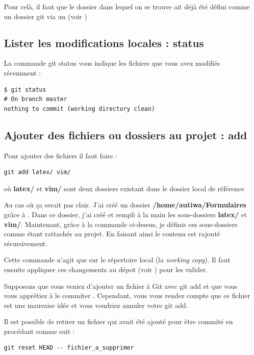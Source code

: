\documentclass[a4paper,twoside]{article}
\begin{document}
Pour celà, il faut que le dossier dans lequel on se trouve ait déjà été défini comme un dossier git via un  (voir )

\subsection{Lister les modifications locales : status}
La commande git status vous indique les fichiers que vous avez modifiés récemment :
\begin{verbatim}
$ git status
# On branch master
nothing to commit (working directory clean)
\end{verbatim}

\subsection{Ajouter des fichiers ou dossiers au projet : add} 
Pour ajouter des fichiers il faut faire :
\begin{verbatim}
git add latex/ vim/ 
\end{verbatim}
où \textbf{latex/} et \textbf{vim/} sont deux dossiers existant dans le dossier local de référence

\begin{remarque}
Au cas où ça serait pas clair. J'ai créé un dossier \textbf{/home/autiwa/Formulaires} grâce à . Dans ce dossier, j'ai créé et rempli à la main les sous-dossiers \textbf{latex/} et \textbf{vim/}. Maintenant, grâce à la commande ci-dessus, je définis ces sous-dossiers comme étant rattachés au projet. En faisant ainsi le contenu est rajouté récursivement.
\end{remarque}

\begin{attention}
Cette commande n'agit que sur le répertoire local (la \emph{working copy}). Il faut ensuite appliquer ces changements au dépot (voir ) pour les valider.
\end{attention}

\bigskip

Supposons que vous veniez d'ajouter un fichier à Git avec git add et que vous vous apprêtiez à le \og commiter \fg. Cependant, vous vous rendez compte que ce fichier est une mauvaise idée et vous voudriez annuler votre git add.

Il est possible de retirer un fichier qui avait été ajouté pour être \og commité \fg en procédant comme suit :
\begin{verbatim}
git reset HEAD -- fichier_a_supprimer
\end{verbatim}
\end{document}
